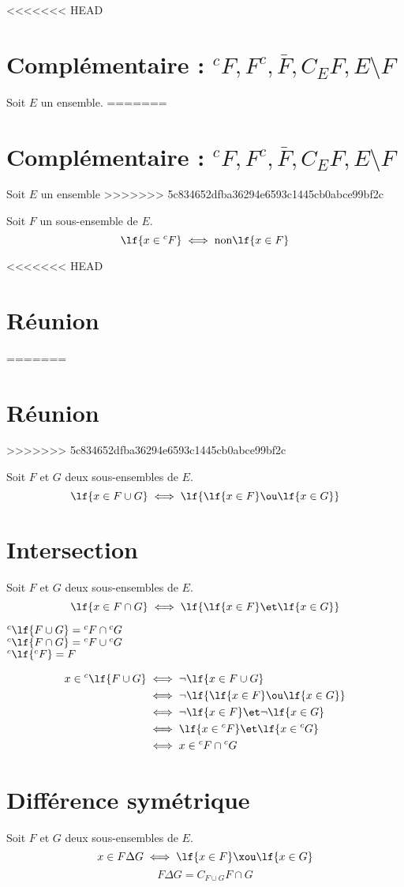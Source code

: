 \documentclass[12pt,twoside,a4paper]{article}
\author{MPSI 2}
\begin{document}
	\maketitle
<<<<<<< HEAD
	\section{Compl\'ementaire : ${^cF},F^c,\bar{F},C_EF,E\setminus F$}
		Soit $E$ un ensemble.
=======
	\section{Complémentaire : ${^cF},F^c,\bar{F},C_EF,E\setminus F$}
		Soit $E$ un ensemble
>>>>>>> 5c834652dfba36294e6593c1445cb0abce99bf2c
		\begin{defi}
			Soit $F$ un sous-ensemble de $E$.\\
			$$\lf{x\in{^cF}}\iff\text{non}\lf{x\in F}$$
		\end{defi}
<<<<<<< HEAD
	\section{R\'eunion}
=======
	\section{Réunion}
>>>>>>> 5c834652dfba36294e6593c1445cb0abce99bf2c
		\begin{defi}
			Soit $F$ et $G$ deux sous-ensembles de $E$.
			$$\lf{x\in F\cup G}\iff\lf{\lf{x\in F}\ou\lf{x\in G}}$$
		\end{defi}
	\section{Intersection}
		\begin{defi}
			Soit $F$ et $G$ deux sous-ensembles de $E$.
			$$\lf{x\in F\cap G}\iff\lf{\lf{x\in F}\et\lf{x\in G}}$$
		\end{defi}
		\begin{prop}
			${^c\lf{F\cup G}}={^cF}\cap{^cG}$ \\
			${^c\lf{F\cap G}}={^cF}\cup{^cG}$ \\
			${^c\lf{^cF}}=F$
		\end{prop}
		\begin{preuve}
			$$\begin{aligned}
				x\in{^c\lf{F\cup G}}&\iff\neg\lf{x\in F\cup G} \\
									&\iff\neg\lf{\lf{x\in F}\ou\lf{x\in G}} \\
									&\iff\neg\lf{x\in F}\et\neg\lf{x\in G} \\
									&\iff\lf{x\in{^cF}}\et\lf{x\in{^cG}} \\
									&\iff x\in{^cF}\cap{^cG}
			\end{aligned}$$
		\end{preuve}
	\section{Diff\'erence sym\'etrique}
		\begin{defi}
			Soit $F$ et $G$ deux sous-ensembles de $E$. \\
			$$x\in F\Delta G\iff\lf{x\in F}\xou\lf{x\in G}$$
			$$F\Delta G=C_{F\cup G}F\cap G$$
		\end{defi}
\end{document}
